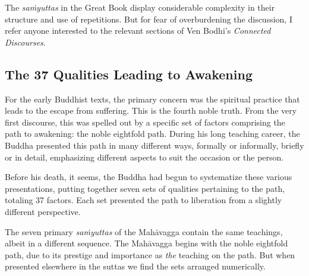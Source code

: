 \documentclass[12pt,openany]{book}%
\begin{document}
The \textit{\textsanskrit{saṁyuttas}} in the Great Book display considerable complexity in their structure and use of repetitions. But for fear of overburdening the discussion, I refer anyone interested to the relevant sections of Ven Bodhi’s \textit{Connected Discourses}.

\subsection*{The 37 Qualities Leading to Awakening}

For the early Buddhist texts, the primary concern was the spiritual practice that leads to the escape from suffering. This is the fourth noble truth. From the very first discourse, this was spelled out by a specific set of factors comprising the path to awakening: the noble eightfold path. During his long teaching career, the Buddha presented this path in many different ways, formally or informally, briefly or in detail, emphasizing different aspects to suit the occasion or the person.

Before his death, it seems, the Buddha had begun to systematize these various presentations, putting together seven sets of qualities pertaining to the path, totaling 37 factors. Each set presented the path to liberation from a slightly different perspective.

The seven primary \textit{\textsanskrit{saṁyuttas}} of the \textsanskrit{Mahāvagga} contain the same teachings, albeit in a different sequence. The \textsanskrit{Mahāvagga} begins with the noble eightfold path, due to its prestige and importance as \emph{the} teaching on the path. But when presented elsewhere in the suttas we find the sets arranged numerically.
\end{document}
